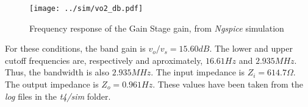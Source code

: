 \vspace{-2cm}
\begin{figure}[H]
\centering
  \texttt{[image: ../sim/vo2\_db.pdf]}
  \caption{Frequency response of the Gain Stage gain, from \textit{Ngspice} simulation}
  \label{fig:gain_stage_gain(freq)}
\end{figure}

\par For these conditions, the band gain is $v_o/v_s = 15.60 dB$. The lower and upper cutoff frequencies are, respectively and aproximately, $16.61 Hz$ and $2.935 MHz$. Thus, the bandwidth is also $2.935 MHz$. The input impedance is $Z_i=614.7\Omega$. The output impedance is $Z_o=0.961 Hz$. These values have been taken from the \textit{log} files in the \textit{t4/sim} folder.








